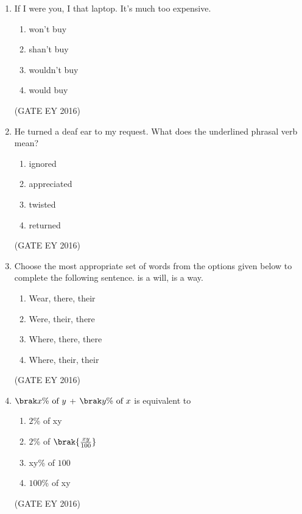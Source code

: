 \documentclass[journal]{IEEEtran}
\begin{document}
\begin{enumerate}
    \item If I were you, I \underline{\hspace{3cm}} that laptop. It's much too expensive.
    \begin{multicols}{2}
    \begin{enumerate}
        \item won't buy
        \item shan't buy
        \item wouldn't buy
        \item would buy
    \end{enumerate}
    \end{multicols}
\hfill{(GATE EY 2016)}

    \item He turned a deaf ear to my request. What does the underlined phrasal verb mean?
    \begin{multicols}{4}
    \begin{enumerate}
        \item ignored
        \item appreciated
        \item twisted
        \item returned
    \end{enumerate}
    \end{multicols}
\hfill{(GATE EY 2016)}

    \item Choose the most appropriate set of words from the options given below to complete the following sentence. \underline{\hspace{2cm}} is a will, \underline{\hspace{2cm}} is a way.
    \begin{multicols}{2}
    \begin{enumerate}
        \item Wear, there, their
        \item Were, their, there
        \item Where, there, there
        \item Where, their, their
    \end{enumerate}
    \end{multicols}
\hfill{(GATE EY 2016)}

    \item $\brak{x\%\ \text{of}\ y}$ + $\brak{y\%\ \text{of}\ x}$ is equivalent to
    \begin{multicols}{4}
    \begin{enumerate}
        \item $2$\% of xy
        \item $2$\% of $\brak{\frac{xy}{100}}$
        \item xy\% of $100$
        \item $100$\% of xy
    \end{enumerate}
    \end{multicols}
\hfill{(GATE EY 2016)}


\end{enumerate}
\end{document}
